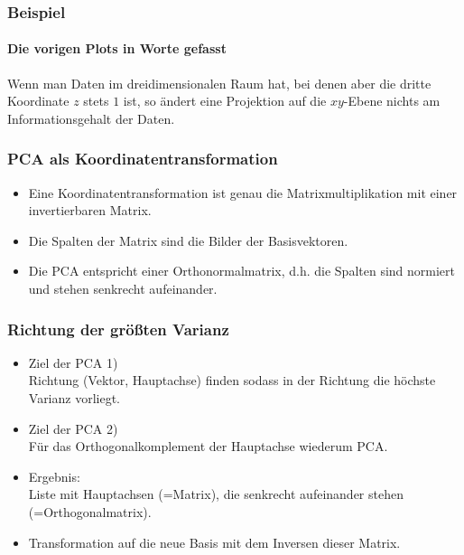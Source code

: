 \begin{frame}
  \frametitle{Beispiel}
  \framesubtitle{Die vorigen Plots in Worte gefasst}
Wenn man Daten im dreidimensionalen Raum hat, bei denen aber die dritte Koordinate $z$
 stets $1$ ist, so ändert eine Projektion auf die $xy$-Ebene \alert{nichts} am Informationsgehalt der Daten.

\end{frame}


\begin{frame}
  \frametitle{PCA als Koordinatentransformation}
  \begin{itemize}[<+->]
   \item Eine Koordinatentransformation ist genau die Matrixmultiplikation mit einer invertierbaren Matrix.
\item  Die Spalten der Matrix sind die Bilder der Basisvektoren.
\item  Die PCA entspricht einer Orthonormalmatrix, d.h. die Spalten sind normiert und stehen senkrecht aufeinander.
\end{itemize}
\end{frame}

\begin{frame}
  \frametitle{Richtung der größten Varianz}
  \begin{itemize}[<+->]
  \item Ziel der PCA 1) \\Richtung (Vektor, Hauptachse) finden sodass in der Richtung die höchste Varianz vorliegt.
  \item Ziel der PCA 2) \\Für das Orthogonalkomplement der Hauptachse wiederum PCA.
  \item Ergebnis: \\Liste mit Hauptachsen (=Matrix), die senkrecht aufeinander stehen (=Orthogonalmatrix).
  \item Transformation auf die neue Basis mit dem \alert{Inversen} dieser Matrix.
  \end{itemize}
  \end{frame}


